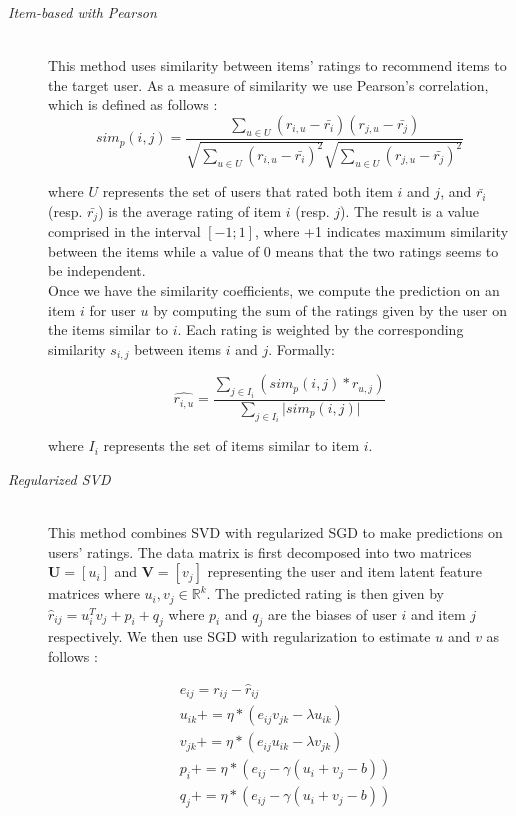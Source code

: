\documentclass[10pt,conference,compsocconf]{IEEEtran}
\begin{document}
\begin{description}

\item[\emph{Item-based with Pearson}]\ \\
This method uses similarity between items' ratings to recommend items to the target user. As a measure of similarity we use Pearson's correlation, which is defined \cite{Sarwar:2001:ICF:371920.372071} as follows :
$$
sim_p(i, j) = \frac{\sum_{u \in U} (r_{i,u} - \bar{r_i})(r_{j,u} - \bar{r_j})}{\sqrt{\sum_{u \in U} (r_{i,u} - \bar{r_i})^2}	\sqrt{\sum_{u \in U} (r_{j,u} - \bar{r_j})^2}}
$$

where $U$ represents the set of users that rated both item $i$ and $j$, and $\bar{r_i}$ (resp. $\bar{r_j}$) is the average rating of item $i$ (resp. $j$). The result is a value comprised in the interval $[-1;1]$, where +1 indicates maximum similarity between the items while a value of 0 means that the two ratings seems to be independent. \\
Once we have the similarity coefficients, we compute the prediction on an item $i$ for user $u$ by computing the sum of the ratings given by the user on the items similar to $i$. Each rating is weighted by the corresponding similarity $s_{i,j}$ between items $i$ and $j$. Formally:

$$
\hat{r_{i,u}} = \frac{\sum_{j \in I_i} (sim_p(i, j) \ast r_{u,j} )}{\sum_{j \in I_i} \vert sim_p(i, j) \vert}
$$ 

where $I_i$ represents the set of items similar to item $i$.
\item[\emph{Regularized SVD}]\ \\
This method combines SVD with regularized SGD to make predictions on users' ratings. The data matrix is first decomposed into two matrices $\textbf{U} = \left[ u_i \right]$ and $\textbf{V} = \left[ v_j \right]$ representing the user and item latent feature matrices where $u_i,v_j \in \mathbb{R}^k$. The predicted rating is then given by $\hat{r}_{ij} = u_i^Tv_j + p_i + q_j$ where $p_i$ and $q_j$ are the biases of user $i$ and item $j$ respectively. We then use SGD with regularization \cite{paterek} to estimate $u$ and $v$ as follows :

$$
\begin{aligned}
& e_{ij} = r_{ij} - \hat{r}_{ij} \\
& u_{ik} += \eta \ast (e_{ij}v_{jk} - \lambda u_{ik}) \\
& v_{jk} += \eta \ast (e_{ij}u_{ik} - \lambda v_{jk}) \\
& p_{i} += \eta  \ast (e_{ij} - \gamma (u_i + v_j - b)) \\
& q_{j} += \eta  \ast (e_{ij} - \gamma (u_i + v_j - b))
\end{aligned}
$$


\end{description}
\end{document}
